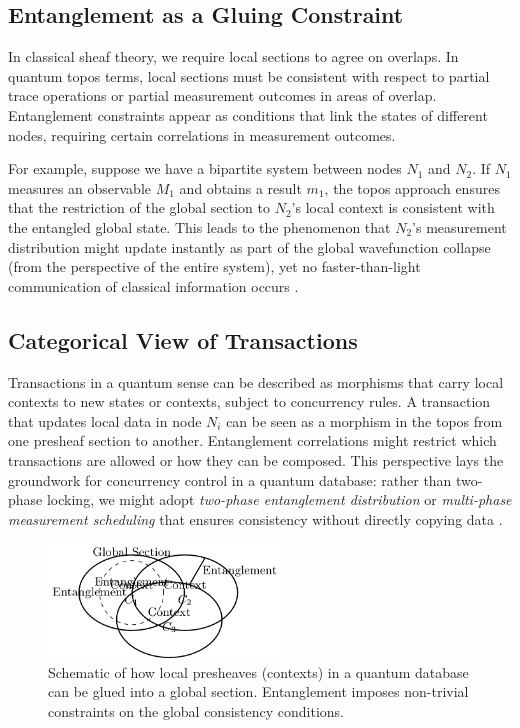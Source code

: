\documentclass[11pt]{article}
\begin{document}
\subsection{Entanglement as a Gluing Constraint}
In classical sheaf theory, we require local sections to agree on overlaps. In quantum topos terms, local sections must be consistent with respect to partial trace operations or partial measurement outcomes in areas of overlap. Entanglement constraints appear as conditions that link the states of different nodes, requiring certain correlations in measurement outcomes.

For example, suppose we have a bipartite system between nodes $N_1$ and $N_2$. If $N_1$ measures an observable $M_1$ and obtains a result $m_1$, the topos approach ensures that the restriction of the global section to $N_2$’s local context is consistent with the entangled global state. This leads to the phenomenon that $N_2$'s measurement distribution might update instantly as part of the global wavefunction collapse (from the perspective of the entire system), yet no faster-than-light communication of classical information occurs \cite{bruza, redei}.

\subsection{Categorical View of Transactions}
Transactions in a quantum sense can be described as morphisms that carry local contexts to new states or contexts, subject to concurrency rules. A transaction that updates local data in node $N_i$ can be seen as a morphism in the topos from one presheaf section to another. Entanglement correlations might restrict which transactions are allowed or how they can be composed. This perspective lays the groundwork for concurrency control in a quantum database: rather than two-phase locking, we might adopt \emph{two-phase entanglement distribution} or \emph{multi-phase measurement scheduling} that ensures consistency without directly copying data \cite{abramsky, heunen}.

\begin{figure}[H]
    \centering
    \includegraphics[width=0.55\textwidth]{topos_entanglement_fig.png}
    \caption{Schematic of how local presheaves (contexts) in a quantum database can be glued into a global section. Entanglement imposes non-trivial constraints on the global consistency conditions.}
    \label{fig:topos_gluing}
\end{figure}
\end{document}
